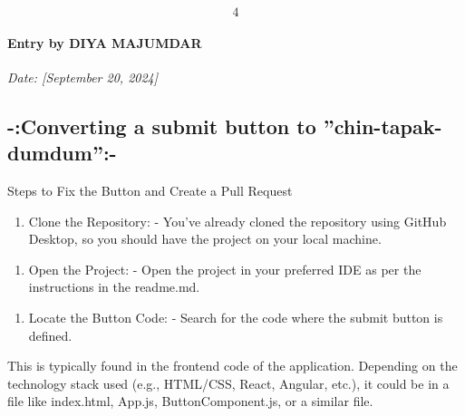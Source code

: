 \documentclass{article} %
\begin{document}
\noindent 

\noindent 

\noindent 

\noindent 

\noindent 

\noindent 

\noindent 

\noindent 
\[4\] 

\paragraph{Entry by DIYA MAJUMDAR}

\noindent \textit{Date: [September 20, 2024]}

\noindent \textit{}

\noindent 
\subsection{-:Converting a submit button to ''chin-tapak- dumdum'':-}

\noindent \textbf{}

\noindent Steps to Fix the Button and Create a Pull Request

\begin{enumerate}
\item  Clone the Repository: - You've already cloned the repository using GitHub Desktop, so you should have the project on your local machine.
\end{enumerate}

\noindent 

\noindent 

\begin{enumerate}
\item  Open the Project: - Open the project in your preferred IDE as per the instructions in the readme.md.
\end{enumerate}

\noindent 

\noindent 

\begin{enumerate}
\item  Locate the Button Code: - Search for the code where the submit button is defined.
\end{enumerate}

\noindent This is typically found in the frontend code of the application. Depending on the technology stack used (e.g., HTML/CSS, React, Angular, etc.), it could be in a file like index.html, App.js, ButtonComponent.js, or a similar file.
\end{document}
